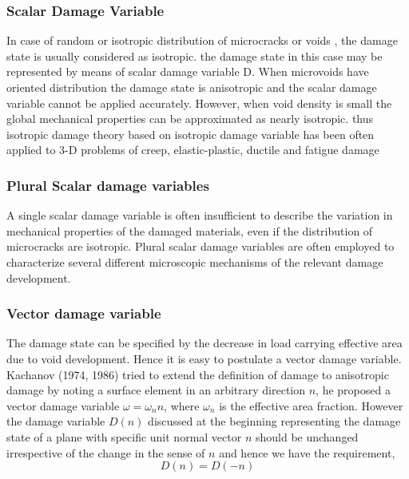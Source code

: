\documentclass[a4paper,12pt]{article}
\begin{document}
\subsubsection*{Scalar Damage Variable}
\indent\indent\indent In case of random or isotropic distribution of microcracks or voids , the damage state is usually considered as isotropic. the damage state in this case may be represented by means of scalar damage variable D. When microvoids  have oriented distribution the damage state is anisotropic and the scalar damage variable cannot be applied accurately. However, when void density is small the global mechanical properties can be approximated as nearly isotropic. thus isotropic damage theory based on isotropic damage variable has been often applied to 3-D problems of creep, elastic-plastic, ductile and fatigue damage
\subsubsection{Plural Scalar damage variables}
\indent\indent\indent A single scalar damage variable is often insufficient to describe the variation in mechanical properties of the damaged materials, even if the distribution of microcracks are isotropic. Plural scalar damage variables are often employed to characterize several different microscopic mechanisms of the relevant damage development.
\subsubsection{Vector damage variable}
\indent\indent\indent The damage state can be specified by the decrease in load carrying effective area due to void development. Hence it is easy to postulate a vector damage variable. Kachanov (1974, 1986) tried to extend the definition of damage to anisotropic damage by noting a surface element in an arbitrary direction $n$, he proposed a vector damage variable $ \omega = \omega_{n}n$, where $\omega_{n}$ is the effective area fraction. However the damage variable $D(n)$ discussed at the beginning representing the damage state of a plane with specific unit normal vector $n$ should be unchanged irrespective of the  change in the sense of $n$ and hence we have the requirement,
\begin{equation}
 D(n) = D(-n)
\end{equation}
\end{document}
